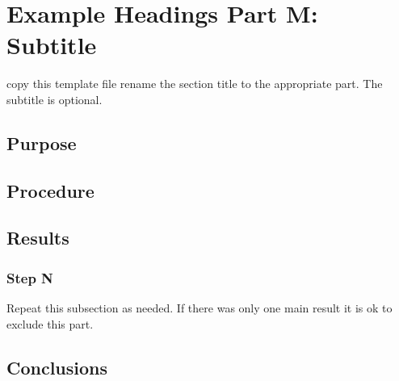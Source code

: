 %
%

\section{Example Headings Part M: Subtitle}

copy this template file rename the section title to the appropriate part. The subtitle is optional.

\subsection{Purpose}

\subsection{Procedure}

\subsection{Results}

\subsubsection{Step N}

Repeat this subsection as needed. If there was only one main result it is ok to exclude this part.

\subsection{Conclusions}


